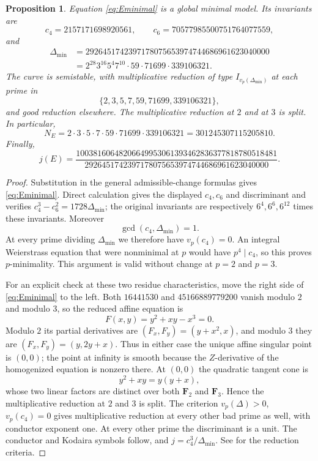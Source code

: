 \documentclass[11pt]{article}
\newtheorem{proposition}[theorem]{Proposition}
\begin{document}
\begin{proposition}\label{prop:minimal-model}
Equation \eqref{eq:Eminimal} is a global minimal model.  Its invariants are
\[
 c_4=2157171698920561,\qquad
 c_6=70577985500751764077559,
\]
and
\[
 \begin{split}
 \Delta_{\min}
 &=2926451742397178075653974744686961623040000\\
 &=2^{28}3^{16}5^4 7^{10}\cdot59\cdot71699\cdot339106321.
 \end{split}
\]
The curve is semistable, with multiplicative reduction of type
$I_{v_p(\Delta_{\min})}$ at each prime in
\[
\{2,3,5,7,59,71699,339106321\},
\]
and good reduction elsewhere.  The multiplicative reduction at $2$ and at
$3$ is split.  In particular,
\[
 N_E=2\cdot3\cdot5\cdot7\cdot59\cdot71699\cdot339106321
     =301245307115205810.
\]
Finally,
\[
 j(E)=
 \frac{10038160648206649953061393462836377818780518481}
 {2926451742397178075653974744686961623040000}.
\]
\end{proposition}
\begin{proof}
Substitution in the general admissible-change formulas gives
\eqref{eq:Eminimal}.  Direct calculation gives the displayed $c_4,c_6$
and discriminant and verifies $c_4^3-c_6^2=1728\Delta_{\min}$; the original
invariants are respectively $6^4,6^6,6^{12}$ times these invariants.
Moreover
\[
 \gcd(c_4,\Delta_{\min})=1.
\]
At every prime dividing $\Delta_{\min}$ we therefore have
$v_p(c_4)=0$.  An integral Weierstrass equation that were nonminimal at
$p$ would have $p^4\mid c_4$, so this proves $p$-minimality.  This argument
is valid without change at $p=2$ and $p=3$.

For an explicit check at these two residue characteristics, move the right
side of \eqref{eq:Eminimal} to the left.  Both $16441530$ and
$45166889779200$ vanish modulo $2$ and modulo $3$, so the reduced affine
equation is
\[
 F(x,y)=y^2+xy-x^3=0.
\]
Modulo $2$ its partial derivatives are $(F_x,F_y)=(y+x^2,x)$, and modulo
$3$ they are $(F_x,F_y)=(y,2y+x)$.  Thus in either case the unique affine
singular point is $(0,0)$; the point at infinity is smooth because the
$Z$-derivative of the homogenized equation is nonzero there.  At $(0,0)$
the quadratic tangent cone is
\[
 y^2+xy=y(y+x),
\]
whose two linear factors are distinct over both $\mathbf F_2$ and
$\mathbf F_3$.  Hence the multiplicative reduction at $2$ and $3$ is
split.  The criterion $v_p(\Delta)>0$, $v_p(c_4)=0$ gives multiplicative
reduction at every other bad prime as well, with conductor exponent one.
At every other prime the discriminant is a unit.  The conductor and Kodaira
symbols follow, and $j=c_4^3/\Delta_{\min}$.  See
\cite[Chapter~VII, Section~5]{Silverman2009} for the reduction criteria.
\end{proof}
\end{document}
